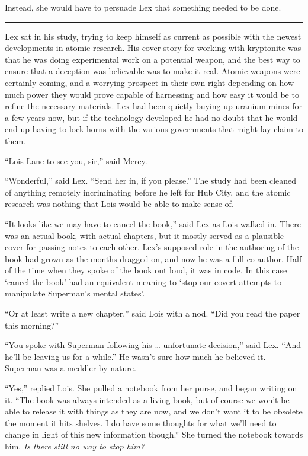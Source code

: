 Instead, she would have to persuade Lex that something needed to be
done.

\begin{center}\rule{0.5\linewidth}{\linethickness}\end{center}

Lex sat in his study, trying to keep himself as current as possible with
the newest developments in atomic research. His cover story for working
with kryptonite was that he was doing experimental work on a potential
weapon, and the best way to ensure that a deception was believable was
to make it real. Atomic weapons were certainly coming, and a worrying
prospect in their own right depending on how much power they would prove
capable of harnessing and how easy it would be to refine the necessary
materials. Lex had been quietly buying up uranium mines for a few years
now, but if the technology developed he had no doubt that he would end
up having to lock horns with the various governments that might lay
claim to them.

``Lois Lane to see you, sir,'' said Mercy.

``Wonderful,'' said Lex. ``Send her in, if you please.'' The study had
been cleaned of anything remotely incriminating before he left for Hub
City, and the atomic research was nothing that Lois would be able to
make sense of.

``It looks like we may have to cancel the book,'' said Lex as Lois
walked in. There was an actual book, with actual chapters, but it mostly
served as a plausible cover for passing notes to each other. Lex's
supposed role in the authoring of the book had grown as the months
dragged on, and now he was a full co‐author. Half of the time when they
spoke of the book out loud, it was in code. In this case `cancel the
book' had an equivalent meaning to `stop our covert attempts to
manipulate Superman's mental states'.

``Or at least write a new chapter,'' said Lois with a nod. ``Did you
read the paper this morning?''

``You spoke with Superman following his \ldots{} unfortunate decision,''
said Lex. ``And he'll be leaving us for a while.'' He wasn't sure how
much he believed it. Superman was a meddler by nature.

``Yes,'' replied Lois. She pulled a notebook from her purse, and began
writing on it. ``The book was always intended as a living book, but of
course we won't be able to release it with things as they are now, and
we don't want it to be obsolete the moment it hits shelves. I do have
some thoughts for what we'll need to change in light of this new
information though.'' She turned the notebook towards him. \emph{Is
there still no way to stop him?}

